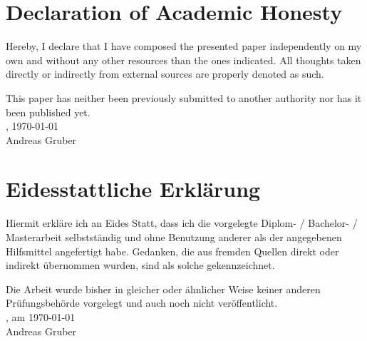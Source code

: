 \section*{Declaration of Academic Honesty}
Hereby, I declare that I have composed the presented paper independently on my own and without any other resources than the ones indicated. All thoughts taken directly or indirectly from external sources are properly denoted as such.

This paper has neither been previously submitted to another authority nor has it been published yet. \\[1em]
\varLocation, \today \\[5em]
Andreas Gruber \\[5em]

\section*{Eidesstattliche Erklärung}
Hiermit erkläre ich an Eides Statt, dass ich die vorgelegte Diplom- / Bachelor- / Masterarbeit selbstständig und ohne Benutzung anderer als der angegebenen Hilfsmittel angefertigt habe. Gedanken, die aus fremden Quellen direkt oder indirekt übernommen wurden, sind als solche gekennzeichnet.

Die Arbeit wurde bisher in gleicher oder ähnlicher Weise keiner anderen Prüfungsbehörde vorgelegt und auch noch nicht veröffentlicht. \\[1em]
\varLocation, am \today \\[5em]
Andreas Gruber
